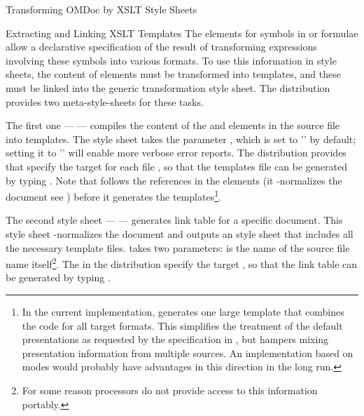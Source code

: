 \begin{tchapter}[id=transform-xsl,short=Transforming OMDoc]{Transforming OMDoc by XSLT Style Sheets}
\begin{tsection}[id=extract-link-xslt]{Extracting and Linking XSLT Templates}
The {} elements for symbols in {\openmath} or {\cmathml}
formulae allow a declarative specification of the result of transforming
expressions involving these symbols into various formats. To use this information
in {\xslt} style sheets, the content of {} elements must be
transformed into {\xslt} templates, and these must be linked into the generic
transformation style sheet. The {\omdoc} distribution provides two
meta-style-sheets for these tasks.

The first one --- {} --- compiles the content of the
{} and {} elements in the source file into {\xslt}
templates. The style sheet takes the parameter
{}, which is set to '{}' by default; setting it to
'{}' will enable more verbose error reports. The {\omdoc} distribution
provides {\unix} {} that specify the target
{} for each {\omdoc} file
{}, so that the templates file can be generated by typing
{}. Note that {} follows the
references in the {} elements (it {}-normalizes the document see
{}) before it generates the templates\footnote{In the current
  implementation, {} generates one large template that combines the
  {\xslt} code for all target formats. This simplifies the treatment of the default
  presentations as requested by the specification in {}, but
  hampers mixing presentation information from multiple sources. An implementation based
  on modes would probably have advantages in this direction in the long run.}.

The second style sheet --- {} --- generates link table for a
specific {\omdoc} document. This style sheet {}-normalizes the document and
outputs an {\xslt} style sheet that includes all the necessary template
files. {} takes two parameters: {} is the name of the
source file name itself\footnote{For some reason {\xslt} processors do not provide access
  to this information portably.}. The {} in the {\omdoc} distribution
specify the target {}, so that the link table can be
generated by typing {}.


\end{tsection}
\end{tchapter}
